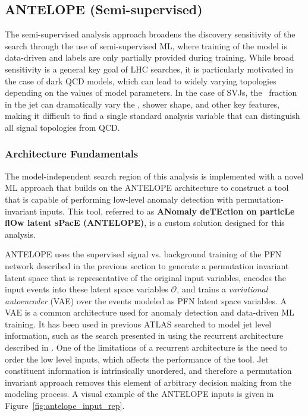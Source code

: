 \subsection{ANTELOPE (Semi-supervised)}
\label{subsec:unsupervised}

The semi-supervised analysis approach broadens the discovery sensitivity of the search through the use of semi-supervised ML, where training of the model is data-driven and labels are only partially provided during training.
While broad sensitivity is a general key goal of LHC searches, it is particularly motivated in the case of dark QCD models, which can lead to widely varying topologies depending on the values of model parameters.
In the case of SVJs, the \rinv~fraction in the jet can dramatically vary the \met, shower shape, and other key features, making it difficult to find a single standard analysis variable that can distinguish all signal topologies from QCD.

\subsubsection{Architecture Fundamentals}
The model-independent search region of this analysis is implemented with a novel ML approach that builds on the ANTELOPE architecture to construct a tool that is capable of performing low-level anomaly detection with permutation-invariant inputs.
This tool, referred to as \textbf{ANomaly deTEction on particLe flOw latent sPacE (ANTELOPE)}, is a custom solution designed for this analysis.

ANTELOPE uses the supervised signal vs. background training of the PFN network described in the previous section to generate a permutation invariant latent space that is representative of the original input variables, encodes the input events into these latent space variables $\mathcal{O}$, and trains a \textit{variational autoencoder} (VAE) over the events modeled as PFN latent space variables. A VAE is a common architecture used for anomaly detection and data-driven ML training. It has been used in previous ATLAS searched to model jet level information, such as the search presented in \cite{yxh} using the recurrent architecture described in \cite{vrnn}. One of the limitations of a recurrent architecture is the need to order the low level inputs, which affects the performance of the tool. Jet constituent information is intrinsically unordered, and therefore a permutation invariant approach removes this element of arbitrary decision making from the modeling process. A visual example of the ANTELOPE inputs is given in Figure~\ref{fig:antelope_input_rep}. 

